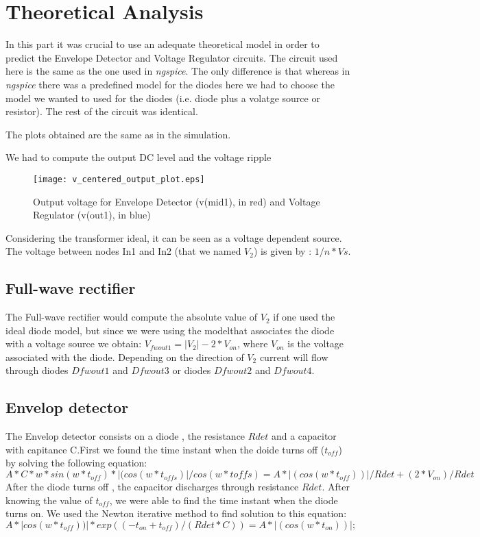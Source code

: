 \section{Theoretical Analysis}
\label{sec:analysis}



In this part it was crucial to use an adequate theoretical model in order to predict the Envelope Detector and Voltage Regulator circuits. The circuit used here is the same as the one used in \textit{ngspice}. The only difference is that whereas in \textit{ngspice} there was a predefined model for the diodes here we had to choose the model we wanted to used for the diodes (i.e. diode plus a volatge source or resistor). The rest of the circuit was identical.

The plots obtained are the same as in the simulation.

We had to compute the output DC level and the voltage ripple


\begin{figure}[H] \centering
\texttt{[image: v\_centered\_output\_plot.eps]}
\caption{Output voltage for Envelope Detector (v(mid1), in red) and Voltage Regulator (v(out1), in blue)}
\label{fig:phase_sim}
\end{figure}

Considering the transformer ideal, it can be seen as a voltage dependent source. The voltage between nodes In1 and In2 (that we named $V_2$) is given by : $1/n * Vs$.

\subsection{Full-wave rectifier}
The Full-wave rectifier would  compute the  absolute value of $V_2$ if one used the ideal diode model, but since we were using the modelthat associates the diode with a voltage source we obtain: $V_{fwout1} = |V_2|- 2*V_{on}$, where $V_{on}$ is the voltage associated with the diode. Depending on the direction of $V_2$ current will flow through diodes $Dfwout1$ and $Dfwout3$ or diodes $Dfwout2$ and $Dfwout4$.

\subsection{Envelop detector}
The Envelop detector consists on a diode , the resistance $Rdet$ and a capacitor with capitance C.First we found the time instant when the doide turns off ($t_{off}$) by solving the following equation:
\begin{equation}
  A*C*w*sin(w*t_{off})*|(cos(w*t_{offs})|/cos(w*toffs) =  A*|(cos(w*t_{off}))|/Rdet +(2*V_{on})/Rdet
\end{equation}
After the diode turns off , the capacitor discharges through resistance $Rdet$.
After knowing the value of $t_{off}$, we were able to find the time instant when  the diode turns on. We used the Newton iterative method to find solution to this equation:
\begin{equation}
   A*|cos(w*t_{off}))|*exp((-t_{on}+t_{off})/(Rdet*C))=  A*|(cos(w*t_{on}))|;
\end{equation}
